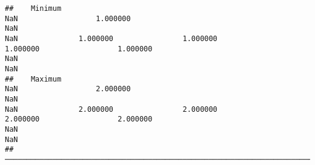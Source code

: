 \documentclass[
]{article}
\begin{document}
\begin{verbatim}
##    Minimum                                                                  NaN                  1.000000                                                                  NaN                                                                  NaN              1.000000                1.000000              1.000000                  1.000000                                                                  NaN                                                                  NaN   
##    Maximum                                                                  NaN                  2.000000                                                                  NaN                                                                  NaN              2.000000                2.000000              2.000000                  2.000000                                                                  NaN                                                                  NaN   
##  ────────────────────────────────────────────────────────────────────────────────────────────────────────────────────────────────────────────────────────────────────────────────────────────────────────────────────────────────────────────────────────────────────────────────────────────────────────────────────────────────────────────────────────────────────────────────────────────────────────────────────────────────────────────────────────────────────────────────────────────
\end{verbatim}
\end{document}
